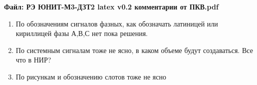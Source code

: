 
\pagecolor{yellow!10}

\begin{flushleft}

\color{black}
\par
\textbf{Файл: РЭ ЮНИТ-М3-ДЗТ2 latex v0.2 комментарии от ПКВ.pdf}
\begin{enumerate}[label=\arabic*., labelsep=4pt, leftmargin=0pt, itemindent=57pt]
\item
По обозначениям сигналов фазных, как обозначать латиницей или кириллицей фазы А,В,С нет пока решения.
\item
По системным сигналам тоже не ясно, в каком объеме будут создаваться. Все что в НИР?
\item
По рисункам и обозначению слотов тоже не ясно
\end{enumerate}

\end{flushleft}